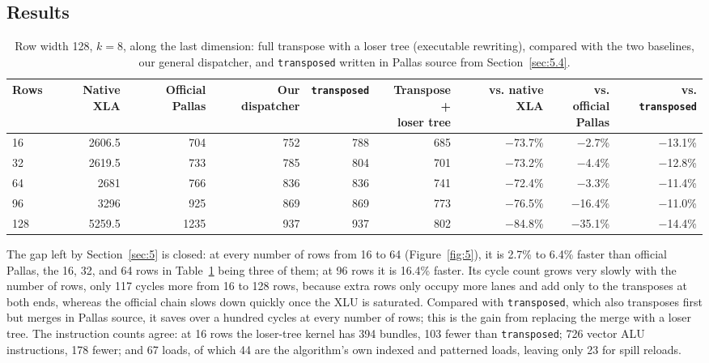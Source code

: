 \documentclass[sigconf,nonacm,balance=false]{acmart}
\newcommand{\code}[1]{\texttt{#1}}
\begin{document}
\subsection{Results}
\label{sec:6.5}

\begin{table}
\centering
\caption{Row width 128, $k = 8$, along the last dimension: full transpose with a loser tree (executable rewriting), compared with the two baselines, our general dispatcher, and \code{transposed} written in Pallas source from Section~\ref{sec:5.4}.}
\label{tab:13}
\begin{tabular}{lrrrrrrrr}
\toprule
Rows & Native XLA & Official Pallas & Our dispatcher & \code{transposed} & \makecell[rb]{Transpose +\\loser tree} & vs. native XLA & \makecell[rb]{vs. official\\Pallas} & vs. \code{transposed} \\
\midrule
16 & 2606.5 & 704 & 752 & 788 & 685 & $-$73.7\% & $-$2.7\% & $-$13.1\% \\
32 & 2619.5 & 733 & 785 & 804 & 701 & $-$73.2\% & $-$4.4\% & $-$12.8\% \\
64 & 2681 & 766 & 836 & 836 & 741 & $-$72.4\% & $-$3.3\% & $-$11.4\% \\
96 & 3296 & 925 & 869 & 869 & 773 & $-$76.5\% & $-$16.4\% & $-$11.0\% \\
128 & 5259.5 & 1235 & 937 & 937 & 802 & $-$84.8\% & $-$35.1\% & $-$14.4\% \\
\bottomrule
\end{tabular}
\end{table}

The gap left by Section~\ref{sec:5} is closed: at every number of rows from 16 to 64 (Figure~\ref{fig:5}), it is 2.7\% to 6.4\% faster than official Pallas, the 16, 32, and 64 rows in Table~\ref{tab:13} being three of them; at 96 rows it is 16.4\% faster. Its cycle count grows very slowly with the number of rows, only 117 cycles more from 16 to 128 rows, because extra rows only occupy more lanes and add only to the transposes at both ends, whereas the official chain slows down quickly once the XLU is saturated. Compared with \code{transposed}, which also transposes first but merges in Pallas source, it saves over a hundred cycles at every number of rows; this is the gain from replacing the merge with a loser tree. The instruction counts agree: at 16 rows the loser-tree kernel has 394 bundles, 103 fewer than \code{transposed}; 726 vector ALU instructions, 178 fewer; and 67 loads, of which 44 are the algorithm's own indexed and patterned loads, leaving only 23 for spill reloads.
\end{document}
